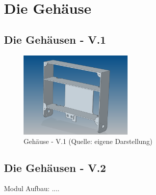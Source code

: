 \renewcommand{\autoren}{Valentyn Chepil, Alexsander Stoiljkovic}
\newpage
\section{Die Gehäuse}
\subsection{Die Gehäusen - V.1}

\begin{figure}[!h]  %
	\centering\includegraphics[width=0.5\textwidth]{images/gehaeuse-v1.png}
	\caption{Gehäuse - V.1 \newline (Quelle: eigene Darstellung)}
	\label{gehaeuse-v1} %
\end{figure}

\subsection{Die Gehäusen - V.2}
Modul Aufbau: ....

